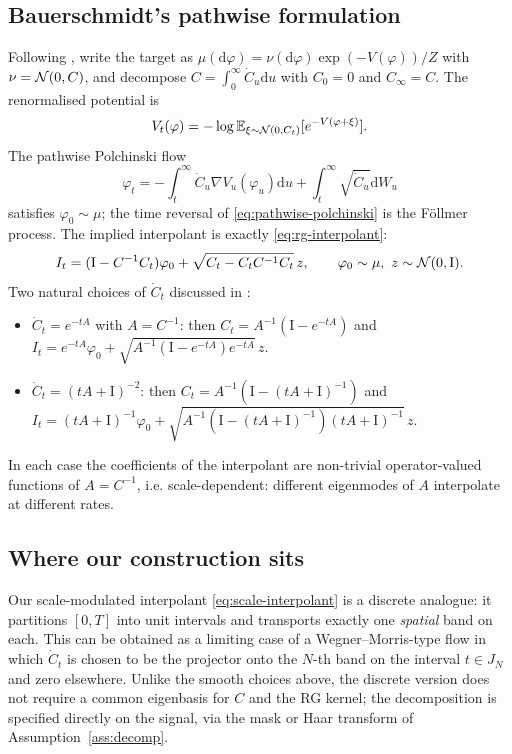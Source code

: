 \documentclass[11pt]{amsart}
\newcommand{\bE}{\mathbb{E}} \newcommand{\bP}{\mathbb{P}}
\newcommand{\rd}{\mathrm{d}}
\theoremstyle{remark}
\numberwithin{equation}{section}
\begin{document}
\subsection{Bauerschmidt's pathwise formulation}
Following \cite{bauerschmidt2023stochastic}, write the target as
$\mu(\rd\varphi)=\nu(\rd\varphi)\exp(-V(\varphi))/Z$ with $\nu=\mathcal{N}(0,C)$, and decompose $C=\int_0^\infty\dot C_u\rd u$ with $C_0=0$ and $C_\infty=C$. The renormalised potential is
\begin{equation}
 V_t(\varphi) = -\log\bE_{\xi\sim\cN(0,C_t)}[e^{-V(\varphi+\xi)}].
\end{equation}
The pathwise Polchinski flow
\begin{equation}
\label{eq:pathwise-polchinski}
 \varphi_t = -\int_t^\infty\dot C_u\nabla V_u(\varphi_u)\rd u + \int_t^\infty\sqrt{\dot C_u}\rd W_u
\end{equation}
satisfies $\varphi_0\sim\mu$; the time reversal of \eqref{eq:pathwise-polchinski} is the F\"ollmer process. The implied interpolant is exactly \eqref{eq:rg-interpolant}:
\begin{equation}
 I_t = (\mathrm{I}-C^{-1}C_t)\varphi_0 + \sqrt{C_t - C_t C^{-1}C_t}\,z,\qquad \varphi_0\sim\mu,\ z\sim\cN(0,\mathrm{I}).
\end{equation}
Two natural choices of $\dot C_t$ discussed in \cite{bauerschmidt2023stochastic}:
\begin{itemize}
\item $\dot C_t = e^{-tA}$ with $A=C^{-1}$: then $C_t=A^{-1}(\mathrm{I}-e^{-tA})$ and $I_t = e^{-tA}\varphi_0 + \sqrt{A^{-1}(\mathrm{I}-e^{-tA})e^{-tA}}\,z$.
\item $\dot C_t = (tA+\mathrm{I})^{-2}$: then $C_t = A^{-1}(\mathrm{I}-(tA+\mathrm{I})^{-1})$ and $I_t = (tA+\mathrm{I})^{-1}\varphi_0 + \sqrt{A^{-1}(\mathrm{I}-(tA+\mathrm{I})^{-1})(tA+\mathrm{I})^{-1}}\,z$.
\end{itemize}
In each case the coefficients of the interpolant are non-trivial operator-valued functions of $A=C^{-1}$, i.e. scale-dependent: different eigenmodes of $A$ interpolate at different rates.

\subsection{Where our construction sits}
Our scale-modulated interpolant \eqref{eq:scale-interpolant} is a discrete analogue: it partitions $[0,T]$ into unit intervals and transports exactly one \emph{spatial} band on each. This can be obtained as a limiting case of a Wegner--Morris-type flow in which $\dot C_t$ is chosen to be the projector onto the $N$-th band on the interval $t\in J_N$ and zero elsewhere. Unlike the smooth choices above, the discrete version does not require a common eigenbasis for $C$ and the RG kernel; the decomposition is specified directly on the signal, via the mask or Haar transform of Assumption~\ref{ass:decomp}.
\end{document}
